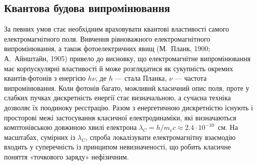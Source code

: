 \subsection*{Квантова будова випромінювання}



За певних умов стає необхідним враховувати квантові властивості самого електромагнітного поля. Вивчення рівноважного
електромагнітного випромінювання, а також фотоелектричних явищ (М.~Планк, 1900; А.~Айнштайн, 1905) привело до висновку,
що електромагнітне випромінювання має корпускулярні властивості й може розглядатися як сукупність окремих
квантів-фотонів з енергією $h\nu$, де $h$ --- стала Планка, $\nu$ --- частота випромінювання. Коли фотонів багато,
можливий класичний опис поля, проте у слабких пучках дискретність енергії стає визначальною, а сучасна техніка дозволяє
їх поодиноку реєстрацію. Разом з енергетичною дискретністю існують і просторові межі застосування класичної
електродинаміки, які визначаються комптонівською довжиною хвилі електрона $\lambda_C = h/m_e c \approx 2.4 \cdot 10^{-10}$~см. На
масштабах, сумірних із $\lambda_C$, спроба локалізувати електромагнітну взаємодію входить у суперечність із принципом
невизначеності, що робить класичне поняття «точкового заряду» нефізичним.


